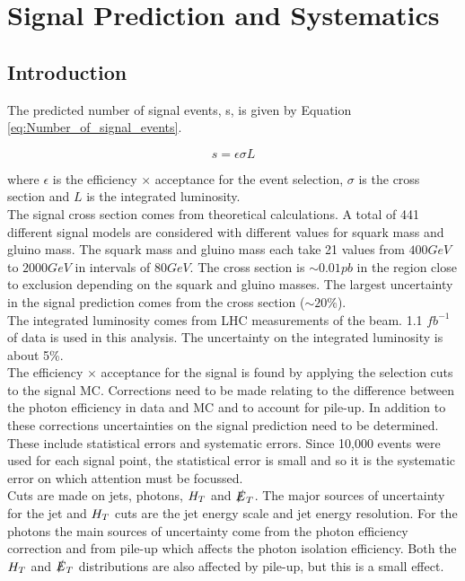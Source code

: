\chapter{Signal Prediction and Systematics}

\section{Introduction}

The predicted number of signal events, s, is given by Equation
\ref{eq:Number_of_signal_events}.

\begin{equation}
s = \epsilon \sigma L
\label{eq:Number_of_signal_events}
\end{equation}

where $\epsilon$ is the efficiency $\times$ acceptance for the event selection,
$\sigma$ is the cross section and $L$ is the integrated luminosity. \\

The signal cross section comes from theoretical calculations. A total of 441 
different signal models are considered with different values for squark mass and 
gluino mass. The squark mass and gluino mass each take 21 values from $400 
\unit{GeV}$ to $2000 \unit{GeV}$ in intervals of $80 \unit{GeV}$. The cross 
section is $\sim 0.01 \unit{pb}$ in the region close to exclusion depending on 
the squark and gluino masses. The largest uncertainty in the signal prediction 
comes from the cross section ($\sim 20 \unit{\%}$). \\

The integrated luminosity comes from LHC measurements of the beam. 1.1
$\unit{fb^{-1}}$ of data is used in this analysis. The uncertainty on the 
integrated luminosity is about 5\unit{\%}. \\

The efficiency $\times$ acceptance for the signal is found by applying the 
selection cuts to the signal MC. Corrections need to be made relating to the 
difference between the photon efficiency in data and MC and to account for 
pile-up. In addition to these corrections uncertainties on the signal prediction
need to be determined. These include statistical errors and systematic errors. 
Since 10,000 events were used for each signal point, the statistical error is 
small and so it is the systematic error on which attention must be focussed. \\

Cuts are made on jets, photons, $H_{T}$ and $\slashed{E}_{T}$. The major sources of
uncertainty for the jet and $H_{T}$ cuts are the jet energy scale and jet energy 
resolution. For the photons the main sources of uncertainty come from the photon
efficiency correction and from pile-up which affects the photon isolation 
efficiency. Both the $H_{T}$ and $\slashed{E}_{T}$ distributions are also affected by 
pile-up, but this is a small effect. \\

